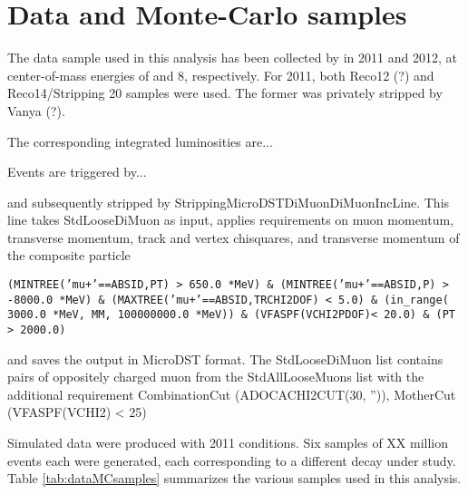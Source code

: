 % 

\section{Data and Monte-Carlo samples}
\label{sec:dataMC}

The data sample used in this analysis has been collected by \lhcb in 2011 and 2012, at center-of-mass energies of \tev and 8\tev, respectively. For 2011, both Reco12
(?) and Reco14/Stripping 20 samples were used.  The former was privately stripped by Vanya (?).  

The corresponding integrated luminosities are...

Events are triggered by... 

and subsequently stripped by StrippingMicroDSTDiMuonDiMuonIncLine. This line takes StdLooseDiMuon as input, applies requirements on 
muon momentum, transverse momentum, track and vertex chisquares, and transverse momentum of the composite particle 

{\tt{(MINTREE('mu+'==ABSID,PT) > 650.0 *MeV) \& 
(MINTREE('mu+'==ABSID,P) > -8000.0 *MeV) \& 
(MAXTREE('mu+'==ABSID,TRCHI2DOF) < 5.0) \& 
(in\_range( 3000.0 *MeV, MM, 100000000.0 *MeV)) \& 
(VFASPF(VCHI2PDOF)< 20.0) \& 
(PT > 2000.0)}}

and saves the output in MicroDST format. The StdLooseDiMuon list contains pairs of oppositely charged muon from the StdAllLooseMuons list with the additional 
requirement CombinationCut  (ADOCACHI2CUT(30, '')), MotherCut   (VFASPF(VCHI2) < 25)


Simulated data were produced with 2011 conditions. Six samples of XX million events each were generated, each corresponding to a different decay under study. 
Table \ref{tab:dataMCsamples} summarizes the various samples used in this analysis. 
